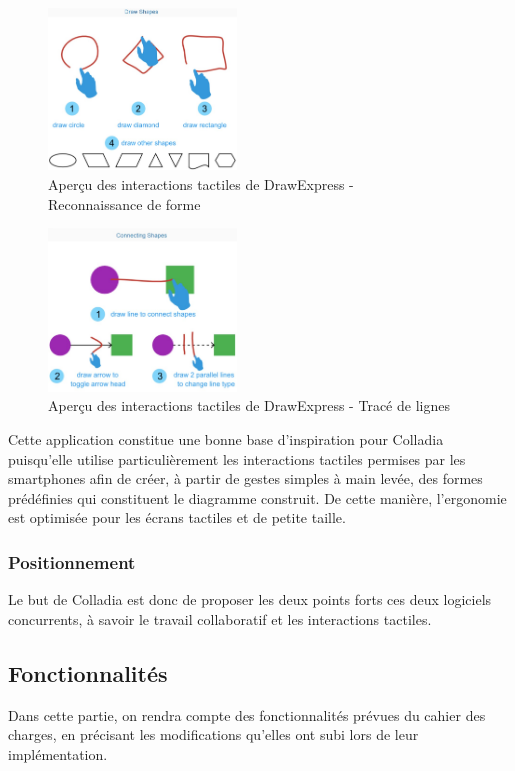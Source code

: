\begin{figure}[!h]
	\centering
	\includegraphics[width=5cm]{img/DrawExpressRecognition}
	\caption{Aperçu des interactions tactiles de DrawExpress - \\Reconnaissance de forme}
\end{figure}

\begin{figure}[!h]
	\centering
	\includegraphics[width=5cm]{img/DrawExpressLinks}
	\caption{Aperçu des interactions tactiles de DrawExpress - Tracé de lignes}
\end{figure}

Cette application constitue une bonne base d'inspiration pour Colladia puisqu'elle  utilise particulièrement les interactions tactiles permises par les smartphones afin de créer, à partir de gestes simples à main levée, des formes prédéfinies qui constituent le diagramme construit. De cette manière, l'ergonomie est optimisée pour les écrans tactiles et de petite taille.

\subsubsection{Positionnement}
Le but de Colladia est donc de proposer les deux points forts ces deux logiciels concurrents, à savoir le travail collaboratif et les interactions tactiles.

\subsection{Fonctionnalités}
Dans cette partie, on rendra compte des fonctionnalités prévues du cahier des charges, en précisant les modifications qu'elles ont subi lors de leur implémentation.

